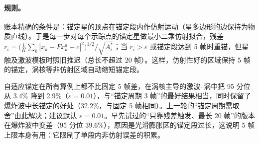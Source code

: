 \paragraph{规则。}账本精确的条件是：锚定星的顶点在锚定段内作仿射运动（星多边形的边保持为物质直线）。于是每一步对每个示踪点的锚定星做最小二乘仿射拟合，残差 $r_i=\big(\tfrac1K\sum_k|x_k-Fx^a_k-c|^2\big)^{1/2}/\sqrt{A^\ast_i}$；当 $r_i>\varepsilon$ 或锚定段达到 5 帧时重锚，但星触及激波模板时照旧推迟（总长不超过 20 帧）。这样，仿射性好的区域保持 5 帧的锚定，涡核等非仿射区域自动缩短锚定段。
\begin{table}[!htbp]\centering\small\caption{密度中位误差 / 95 分位：固定 5 帧与自适应锚定（$\varepsilon=0.01,0.02,0.04$）。}\end{table}
自适应锚定在所有算例上都不比固定 5 帧差，在涡核主导的激波–涡中把 95 分位从 3.4\% 降到 2.9\%（$\varepsilon=0.01$），与“锚定周期 3 帧”的最好结果相当，同时保留了爆炸波中长锚定的好处（32.2\%，与固定 5 帧相同）。上一轮的“锚定周期需取舍”由此解决；建议默认 $\varepsilon=0.01$。早先试过的“只靠残差触发、最长 20 帧”的版本在爆炸波中变差（95 分位 39.6\%），原因是光滑膨胀区的锚定段过长，这说明 5 帧上限本身有用：它限制了单段内非仿射误差的积累。
